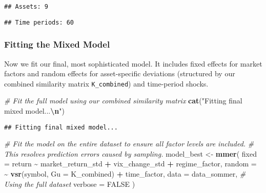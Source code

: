 \documentclass[
]{article}
\newenvironment{Shaded}{\begin{snugshade}}{\end{snugshade}}
\newcommand{\AttributeTok}[1]{\textcolor[rgb]{0.13,0.29,0.53}{#1}}
\newcommand{\CommentTok}[1]{\textcolor[rgb]{0.56,0.35,0.01}{\textit{#1}}}
\newcommand{\ConstantTok}[1]{\textcolor[rgb]{0.56,0.35,0.01}{#1}}
\newcommand{\FunctionTok}[1]{\textcolor[rgb]{0.13,0.29,0.53}{\textbf{#1}}}
\newcommand{\NormalTok}[1]{#1}
\newcommand{\OtherTok}[1]{\textcolor[rgb]{0.56,0.35,0.01}{#1}}
\newcommand{\SpecialCharTok}[1]{\textcolor[rgb]{0.81,0.36,0.00}{\textbf{#1}}}
\newcommand{\StringTok}[1]{\textcolor[rgb]{0.31,0.60,0.02}{#1}}
\begin{document}
\begin{verbatim}
## Assets: 9
\end{verbatim}

\begin{Shaded}
\end{Shaded}

\begin{verbatim}
## Time periods: 60
\end{verbatim}

\subsubsection{Fitting the Mixed Model}\label{fitting-the-mixed-model}

Now we fit our final, most sophisticated model. It includes fixed
effects for market factors and random effects for asset-specific
deviations (structured by our combined similarity matrix
\texttt{K\_combined}) and time-period shocks.

\begin{Shaded}
\begin{Highlighting}[]
\CommentTok{\# Fit the full model using our combined similarity matrix}
\FunctionTok{cat}\NormalTok{(}\StringTok{"Fitting final mixed model...}\SpecialCharTok{\textbackslash{}n}\StringTok{"}\NormalTok{)}
\end{Highlighting}
\end{Shaded}

\begin{verbatim}
## Fitting final mixed model...
\end{verbatim}

\begin{Shaded}
\begin{Highlighting}[]
\CommentTok{\# Fit the model on the entire dataset to ensure all factor levels are included.}
\CommentTok{\# This resolves prediction errors caused by sampling.}
\NormalTok{model\_best }\OtherTok{\textless{}{-}} \FunctionTok{mmer}\NormalTok{(}
  \AttributeTok{fixed =}\NormalTok{ return }\SpecialCharTok{\textasciitilde{}}\NormalTok{ market\_return\_std }\SpecialCharTok{+}\NormalTok{ vix\_change\_std }\SpecialCharTok{+}\NormalTok{ regime\_factor,}
  \AttributeTok{random =} \SpecialCharTok{\textasciitilde{}} \FunctionTok{vsr}\NormalTok{(symbol, }\AttributeTok{Gu =}\NormalTok{ K\_combined) }\SpecialCharTok{+}\NormalTok{ time\_factor,}
  \AttributeTok{data =}\NormalTok{ data\_sommer, }\CommentTok{\# Using the full dataset}
  \AttributeTok{verbose =} \ConstantTok{FALSE}
\NormalTok{)}
\end{Highlighting}
\end{Shaded}
\end{document}

